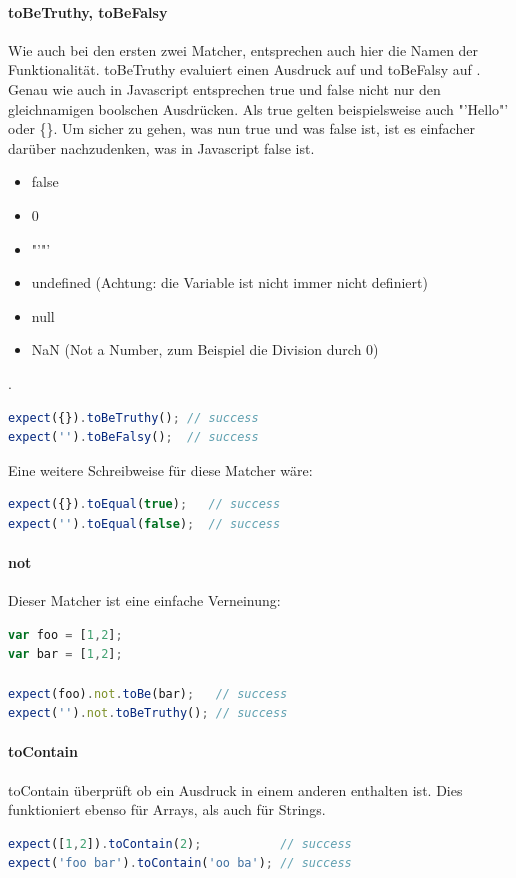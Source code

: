 \paragraph{toBeTruthy, toBeFalsy}
Wie auch bei den ersten zwei Matcher, entsprechen auch hier die Namen der Funktionalität. toBeTruthy evaluiert einen Ausdruck auf  und toBeFalsy auf . Genau wie auch in Javascript entsprechen true und false nicht nur den gleichnamigen boolschen Ausdrücken. Als true gelten beispielsweise auch "'Hello"' oder \{\}. Um sicher zu gehen, was nun true und was false ist, ist es einfacher darüber nachzudenken, was in Javascript false ist.
\begin{itemize}
  \item false
  \item 0
  \item "'"'
  \item undefined (Achtung: die Variable  ist nicht immer nicht definiert)
  \item null
  \item NaN (Not a Number, zum Beispiel die Division durch 0)
\end{itemize}
 \autocite[17]{Hahn:2013}.
\begin{lstlisting}[language=JavaScript]
expect({}).toBeTruthy(); // success
expect('').toBeFalsy();  // success
\end{lstlisting}
Eine weitere Schreibweise für diese Matcher wäre:
\begin{lstlisting}[language=JavaScript]
expect({}).toEqual(true);   // success
expect('').toEqual(false);  // success
\end{lstlisting}

\paragraph{not}
Dieser Matcher ist eine einfache Verneinung:
\begin{lstlisting}[language=JavaScript]
var foo = [1,2];
var bar = [1,2];

expect(foo).not.toBe(bar);   // success
expect('').not.toBeTruthy(); // success
\end{lstlisting}

\paragraph{toContain}
toContain überprüft ob ein Ausdruck in einem anderen enthalten ist. Dies funktioniert ebenso für Arrays, als auch für Strings.
\begin{lstlisting}[language=JavaScript]
expect([1,2]).toContain(2);           // success
expect('foo bar').toContain('oo ba'); // success
\end{lstlisting}

